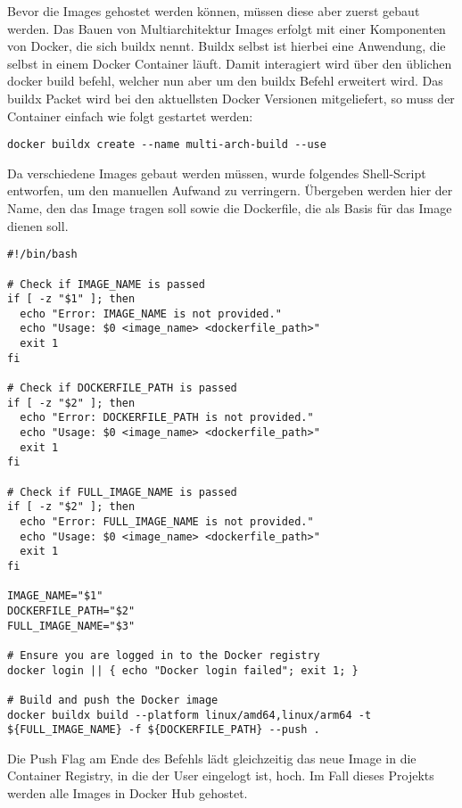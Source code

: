 Bevor die Images gehostet werden können, müssen diese aber zuerst gebaut werden.
Das Bauen von Multiarchitektur Images erfolgt mit einer Komponenten von Docker, die sich buildx nennt.
Buildx selbst ist hierbei eine Anwendung, die selbst in einem Docker Container läuft.
Damit interagiert wird über den üblichen docker build befehl, welcher nun aber um den buildx Befehl erweitert wird.
Das buildx Packet wird bei den aktuellsten Docker Versionen mitgeliefert, so muss der Container einfach wie folgt gestartet werden:

\lstset{language=Shell}
\begin{lstlisting}[label={lst:lst-shell-buildx-setup}]
docker buildx create --name multi-arch-build --use
\end{lstlisting}

Da verschiedene Images gebaut werden müssen, wurde folgendes Shell-Script entworfen, um den manuellen Aufwand zu verringern.
Übergeben werden hier der Name, den das Image tragen soll sowie die Dockerfile, die als Basis für das Image dienen soll.

\begin{lstlisting}[label={lst:lst-shell-buildx-build}]
#!/bin/bash

# Check if IMAGE_NAME is passed
if [ -z "$1" ]; then
  echo "Error: IMAGE_NAME is not provided."
  echo "Usage: $0 <image_name> <dockerfile_path>"
  exit 1
fi

# Check if DOCKERFILE_PATH is passed
if [ -z "$2" ]; then
  echo "Error: DOCKERFILE_PATH is not provided."
  echo "Usage: $0 <image_name> <dockerfile_path>"
  exit 1
fi

# Check if FULL_IMAGE_NAME is passed
if [ -z "$2" ]; then
  echo "Error: FULL_IMAGE_NAME is not provided."
  echo "Usage: $0 <image_name> <dockerfile_path>"
  exit 1
fi

IMAGE_NAME="$1"
DOCKERFILE_PATH="$2"
FULL_IMAGE_NAME="$3"

# Ensure you are logged in to the Docker registry
docker login || { echo "Docker login failed"; exit 1; }

# Build and push the Docker image
docker buildx build --platform linux/amd64,linux/arm64 -t ${FULL_IMAGE_NAME} -f ${DOCKERFILE_PATH} --push .
\end{lstlisting}

Die Push Flag am Ende des Befehls lädt gleichzeitig das neue Image in die Container Registry, in die der User eingelogt ist, hoch.
Im Fall dieses Projekts werden alle Images in Docker Hub gehostet.

